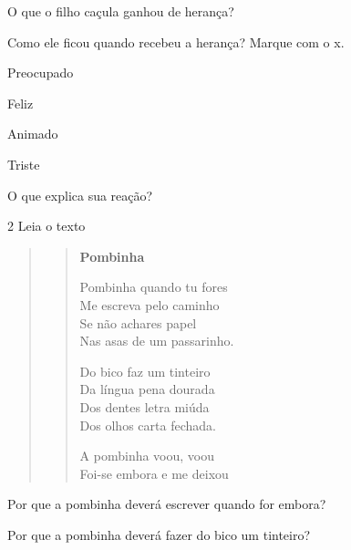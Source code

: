 \begin{escolha}
\item O que o filho caçula ganhou de herança?


\item Como ele ficou quando recebeu a herança? Marque com o x.

\begin{boxlist}
 Preocupado

 Feliz

 Animado

 Triste
\end{boxlist}

\item O que explica sua reação?

\end{escolha}

\pagebreak
\num{2} Leia o texto

\begin{quote}
\begin{verse}
\textbf{Pombinha}

Pombinha quando tu fores\\
Me escreva pelo caminho\\
Se não achares papel\\
Nas asas de um passarinho.

Do bico faz um tinteiro\\
Da língua pena dourada\\
Dos dentes letra miúda\\
Dos olhos carta fechada.

A pombinha voou, voou\\
Foi-se embora e me deixou
\end{verse}

\end{quote}

\begin{escolha}
\item Por que a pombinha deverá escrever quando for embora?


\item Por que a pombinha deverá fazer do bico um tinteiro?


\end{escolha}

